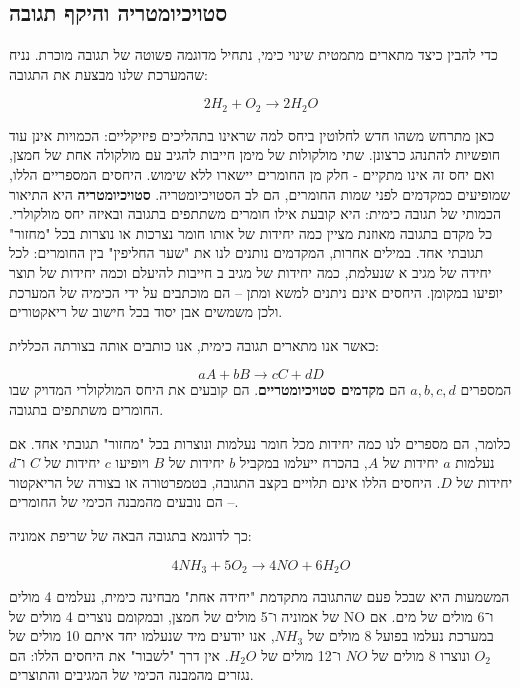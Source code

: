 \documentclass[
  hebrew,
  letterpaper,
  DIV=11,
  numbers=noendperiod]{scrreprt}
\begin{document}
\subsection{סטויכיומטריה והיקף
תגובה}\label{ux5e1ux5d8ux5d5ux5d9ux5dbux5d9ux5d5ux5deux5d8ux5e8ux5d9ux5d4-ux5d5ux5d4ux5d9ux5e7ux5e3-ux5eaux5d2ux5d5ux5d1ux5d4}

כדי להבין כיצד מתארים מתמטית שינוי כימי, נתחיל מדוגמה פשוטה של תגובה
מוכרת. נניח שהמערכת שלנו מבצעת את התגובה:

\[2H_{2} + O_{2} \rightarrow 2H_{2}O\]

כאן מתרחש משהו חדש לחלוטין ביחס למה שראינו בתהליכים פיזיקליים: הכמויות
אינן עוד חופשיות להתנהג כרצונן. שתי מולקולות של מימן חייבות להגיב עם
מולקולה אחת של חמצן, ואם יחס זה אינו מתקיים - חלק מן החומרים יישארו ללא
שימוש. היחסים המספריים הללו, שמופיעים כמקדמים לפני שמות החומרים, הם לב
הסטויכיומטריה. \textbf{סטויכיומטריה} היא התיאור הכמותי של תגובה כימית:
היא קובעת אילו חומרים משתתפים בתגובה ובאיזה יחס מולקולרי. כל מקדם בתגובה
מאוזנת מציין כמה יחידות של אותו חומר נצרכות או נוצרות בכל "מחזור" תגובתי
אחד. במילים אחרות, המקדמים נותנים לנו את "שער החליפין" בין החומרים: לכל
יחידה של מגיב א\textquotesingle{} שנעלמת, כמה יחידות של מגיב
ב\textquotesingle{} חייבות להיעלם וכמה יחידות של תוצר יופיעו במקומן.
היחסים אינם ניתנים למשא ומתן -- הם מוכתבים על ידי הכימיה של המערכת ולכן
משמשים אבן יסוד בכל חישוב של ריאקטורים.

כאשר אנו מתארים תגובה כימית, אנו כותבים אותה בצורתה הכללית:

\[aA + bB \longrightarrow cC + dD\] המספרים \(a,b,c,d\) הם
\textbf{מקדמים סטויכיומטריים}. הם קובעים את היחס המולקולרי המדויק שבו
החומרים משתתפים בתגובה.

כלומר, הם מספרים לנו כמה יחידות מכל חומר נעלמות ונוצרות בכל "מחזור"
תגובתי אחד. אם נעלמות \(a\) יחידות של \(A\), בהכרח ייעלמו במקביל \(b\)
יחידות של \(B\) ויופיעו \(c\) יחידות של \(C\) ו־\(d\) יחידות של \(D\).
היחסים הללו אינם תלויים בקצב התגובה, בטמפרטורה או בצורה של הריאקטור --
הם נובעים מהמבנה הכימי של החומרים.

כך לדוגמא בתגובה הבאה של שריפת אמוניה:

\[4{NH}_{3} + 5O_{2} \longrightarrow 4NO + 6H_{2}O\]

המשמעות היא שבכל פעם שהתגובה מתקדמת "יחידה אחת" מבחינה כימית, נעלמים 4
מולים של אמוניה ו־5 מולים של חמצן, ובמקומם נוצרים 4 מולים של NO ו־6
מולים של מים. אם במערכת נעלמו בפועל 8 מולים של \({NH}_{3}\), אנו יודעים
מיד שנעלמו יחד איתם 10 מולים של \(O_{2}\) ונוצרו 8 מולים של \(NO\) ו־12
מולים של \(H_{2}O\). אין דרך "לשבור" את היחסים הללו: הם נגזרים מהמבנה
הכימי של המגיבים והתוצרים.
\end{document}
